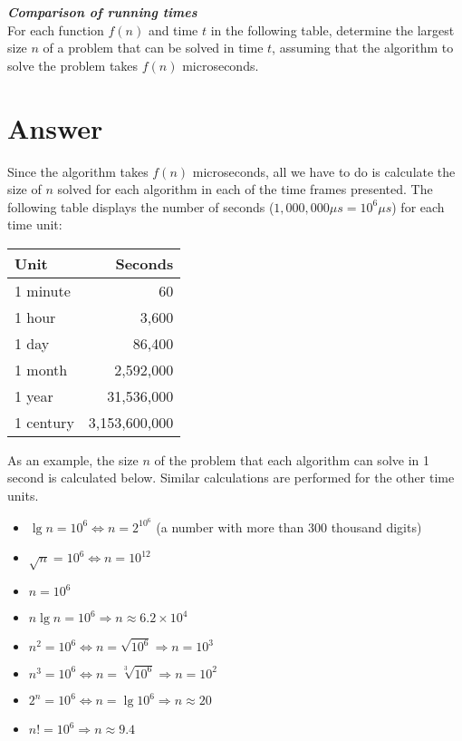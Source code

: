 \documentclass[8pt,a4paper]{article}
\begin{document}
\begin{framed}
\textbf{\textit{Comparison of running times}} \\
For each function $f(n)$ and time $t$ in the following table, determine the
largest size $n$ of a problem that can be solved in time $t$, assuming that the
algorithm to solve the problem takes $f(n)$ microseconds.
\end{framed}

\section*{Answer}

Since the algorithm takes $f(n)$ microseconds, all we have to do is calculate
the size of $n$ solved for each algorithm in each of the time frames presented. The
following table displays the number of seconds ($1,000,000 \mu s = 10^{6} \mu s$)
for each time unit:

\begin{center}
  \begin{tabular}{l r}
    \hline
    \textbf{Unit} & \textbf{Seconds} \\ \hline
    1 minute  & 60             \\
    1 hour    & 3,600          \\
    1 day     & 86,400         \\
    1 month   & 2,592,000      \\
    1 year    & 31,536,000     \\
    1 century & 3,153,600,000 \\
    \hline
  \end{tabular}
\end{center}

As an example, the size $n$ of the problem that each algorithm can solve in 1 second is calculated below.
Similar calculations are performed for the other time units.

\begin{itemize}
  \item $\lg n = 10^{6} \iff n = 2^{10^{6}}$ {\footnotesize (a number with more than 300 thousand digits)}
  \item $\sqrt{n} = 10^{6} \iff n = 10^{12}$
  \item $n = 10^{6}$
  \item $n \lg n = 10^{6} \Rightarrow n \approx 6.2 \times 10^{4}$
  \item $n^{2} = 10^{6} \iff n = \sqrt{10^{6}} \Rightarrow n = 10^{3}$
  \item $n^{3} = 10^{6} \iff n = \sqrt[3]{10^{6}} \Rightarrow n = 10^{2}$
  \item $2^{n} = 10^{6} \iff n = \lg 10^{6} \Rightarrow n \approx 20$
  \item $n! = 10^{6} \Rightarrow n \approx 9.4$
\end{itemize}
\end{document}
